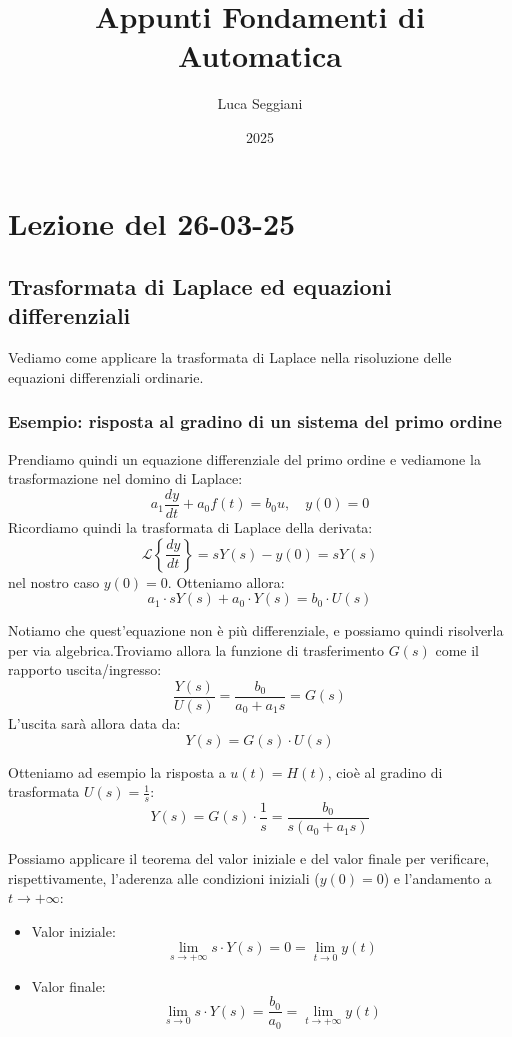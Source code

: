 \documentclass[a4paper,11pt]{article}
\title{Appunti Fondamenti di Automatica}
\author{Luca Seggiani}
\date{2025}
\begin{document}
\section{Lezione del 26-03-25}

\thispagestyle{empty}
\pagestyle{fancy}

\subsection{Trasformata di Laplace ed equazioni differenziali}
Vediamo come applicare la trasformata di Laplace nella risoluzione delle equazioni differenziali ordinarie.

\subsubsection{Esempio: risposta al gradino di un sistema del primo ordine}
Prendiamo quindi un equazione differenziale del primo ordine e vediamone la trasformazione nel domino di Laplace:
$$
a_1 \frac{dy}{dt} + a_0 f(t) = b_0 u, \quad y(0) = 0
$$
Ricordiamo quindi la trasformata di Laplace della derivata:
$$
\mathcal{L}\left\{ \frac{dy}{dt} \right\} = sY(s) - y(0) = sY(s)
$$
nel nostro caso $y(0) = 0$.
Otteniamo allora:
$$
a_1 \cdot s Y(s) + a_0 \cdot Y(s) = b_0 \cdot U(s)
$$

Notiamo che quest'equazione non è più differenziale, e possiamo quindi risolverla per via algebrica.Troviamo allora la funzione di trasferimento $G(s)$ come il rapporto uscita/ingresso:
$$
\frac{Y(s)}{U(s)} = \frac{b_0}{a_0 + a_1 s} = G(s) 
$$
L'uscita sarà allora data da:
$$
Y(s) = G(s) \cdot U(s)
$$

Otteniamo ad esempio la risposta a $u(t) = H(t)$, cioè al gradino di trasformata $U(s) = \frac{1}{s}$:
$$
Y(s) = G(s) \cdot \frac{1}{s} = \frac{b_0}{s (a_0 + a_1 s)}
$$

Possiamo applicare il teorema del valor iniziale e del valor finale per verificare, rispettivamente, l'aderenza alle condizioni iniziali ($y(0) = 0$) e l'andamento a $t \rightarrow +\infty$:
\begin{itemize}
	\item Valor iniziale:
		$$
		\lim_{s \rightarrow + \infty} s \cdot Y(s) = 0 =\lim_{t \rightarrow 0} y(t)
		$$
	\item Valor finale:
		$$
		\lim_{s \rightarrow 0} s \cdot Y(s) = \frac{b_0}{a_0} =\lim_{t \rightarrow +\infty} y(t)
		$$
\end{itemize}
\end{document}
